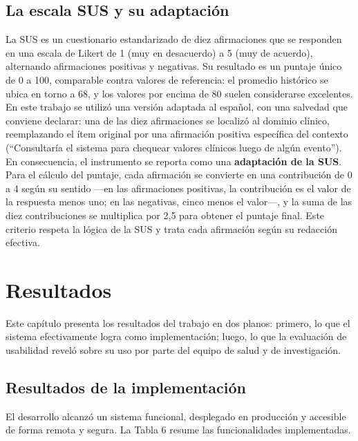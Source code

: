 \subsection{La escala SUS y su adaptación}
La SUS es un cuestionario estandarizado de diez afirmaciones que se responden en una escala de Likert de 1 (muy en desacuerdo) a 5 (muy de acuerdo), alternando afirmaciones positivas y negativas. Su resultado es un puntaje único de 0 a 100, comparable contra valores de referencia: el promedio histórico se ubica en torno a 68, y los valores por encima de 80 suelen considerarse excelentes.\\

En este trabajo se utilizó una versión adaptada al español, con una salvedad que conviene declarar: una de las diez afirmaciones se localizó al dominio clínico, reemplazando el ítem original por una afirmación positiva específica del contexto (“Consultaría el sistema para chequear valores clínicos luego de algún evento”). En consecuencia, el instrumento se reporta como una \textbf{adaptación de la SUS}. Para el cálculo del puntaje, cada afirmación se convierte en una contribución de 0 a 4 según su sentido —en las afirmaciones positivas, la contribución es el valor de la respuesta menos uno; en las negativas, cinco menos el valor—, y la suma de las diez contribuciones se multiplica por 2,5 para obtener el puntaje final. Este criterio respeta la lógica de la SUS y trata cada afirmación según su redacción efectiva.\\


\section{Resultados}
Este capítulo presenta los resultados del trabajo en dos planos: primero, lo que el sistema efectivamente logra como implementación; luego, lo que la evaluación de usabilidad reveló sobre su uso por parte del equipo de salud y de investigación.\\


\subsection{Resultados de la implementación}
El desarrollo alcanzó un sistema funcional, desplegado en producción y accesible de forma remota y segura. La Tabla 6 resume las funcionalidades implementadas.\\


